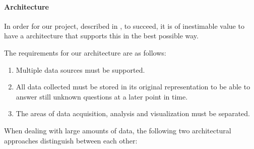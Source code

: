 \paragraph{Architecture}
\label{par:architecture}
In order for our project, described in , to succeed, it is of inestimable value to have a
architecture that supports this in the best possible way.

The requirements for our architecture are as follows:
\begin{enumerate}
  \item Multiple data sources must be supported.
  \item All data collected must be stored in its original representation to be able to answer still unknown questions at a later point in time.
  \item The areas of data acquisition, analysis and visualization must be separated.
\end{enumerate}

When dealing with large amounts of data, the following two architectural approaches distinguish between each other:

